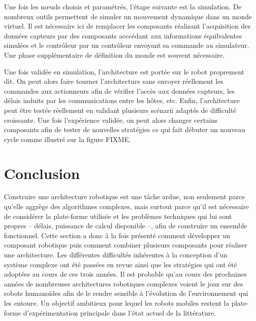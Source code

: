 Une fois les n\oe uds choisis et paramétrés, l'étape suivante est la
simulation. De nombreux outils permettent de simuler un mouvement
dynamique dans un monde virtuel. Il est nécessaire ici de remplacer
les composants réalisant l'acquisition des données capteurs par des
composants acccédant aux informations équilvalentes simulées et le
contrôleur par un contrôleur envoyant sa commande au simulateur. Une
phase supplémentaire de définition du monde est souvent nécessaire.


Une fois validée en simulation, l'architecture est portée sur le robot
proprement dit. On peut alors faire tourner l'architecture sans
envoyer réellement les commandes aux actionneurs afin de vérifier
l'accès aux données capteurs, les délais induits par les
communications entre les hôtes, etc. Enfin, l'architecture peut être
testée réellement en validant plusieurs scénarii adaptés de difficulté
croissante. Une fois l'expérience validée, on peut alors changer
certains composants afin de tester de nouvelles stratégies ce qui fait
débuter un nouveau cycle comme illustré sur la figure FIXME.


\section{Conclusion}


Construire une architecture robotique est une tâche ardue, non
seulement parce qu'elle aggrège des algorithmes complexes, mais
surtout parce qu'il est nécessaire de considérer la plate-forme
utilisée et les problèmes techniques qui lui sont propres -- délais,
puissance de calcul disponible --, afin de construire un ensemble
fonctionnel. Cette section a donc à la fois présenté comment
développer un composant robotique puis comment combiner plusieurs
composants pour réaliser une architecture. Les différentes difficultés
inhérentes à la conception d'un système complexe ont été passées en
revue ainsi que les stratégies qui ont été adoptées au cours de ces
trois années. Il est probable qu'au cours des prochaines années de
nombreuses architectures robotiques complexes voient le jour sur des
robots humanoïdes afin de le rendre sensible à l'évolution de
l'environnement qui les entoure. Un objectif ambitieux pour lequel les
robots mobiles restent la plate-forme d'expérimentation principale
dans l'état actuel de la littérature.


